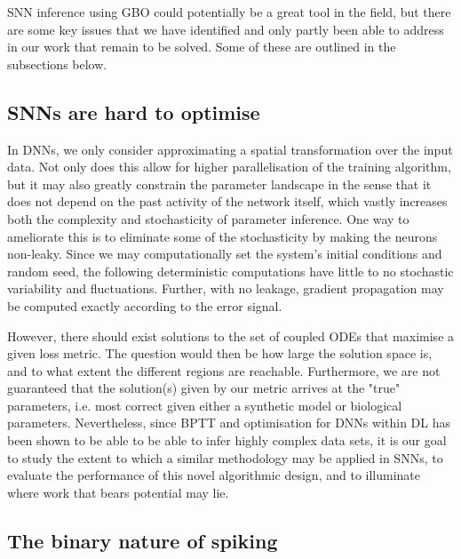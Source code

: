 \documentclass[mphil,deptreport,ianc]{infthesis} %
\begin{document}
SNN inference using GBO could potentially be a great tool in the field, but there are some key issues that we have identified and only partly been able to address in our work that remain to be solved. Some of these are outlined in the subsections below.


\subsection*{SNNs are hard to optimise}

In DNNs, we only consider approximating a spatial transformation over the input data. Not only does this allow for higher parallelisation of the training algorithm, but it may also greatly constrain the parameter landscape in the sense that it does not depend on the past activity of the network itself, which vastly increases both the complexity and stochasticity of parameter inference. 
One way to ameliorate this is to eliminate some of the stochasticity by making the neurons non-leaky. Since we may computationally set the system’s initial conditions and random seed, the following deterministic computations have little to no stochastic variability and fluctuations. Further, with no leakage, gradient propagation may be computed exactly according to the error signal.

However, there should exist solutions to the set of coupled ODEs that maximise a given loss metric. 
The question would then be how large the solution space is, and to what extent the different regions are reachable. 
Furthermore, we are not guaranteed that the solution(s) given by our metric arrives at the "true" parameters, i.e. most correct given either a synthetic model or biological parameters.
Nevertheless, since BPTT and optimisation for DNNs within DL has been shown to be able to be able to infer highly complex data sets, it is our goal to study the extent to which a similar methodology may be applied in SNNs, to evaluate the performance of this novel algorithmic design, and to illuminate where work that bears potential may lie.


\subsection*{The binary nature of spiking}
\end{document}
